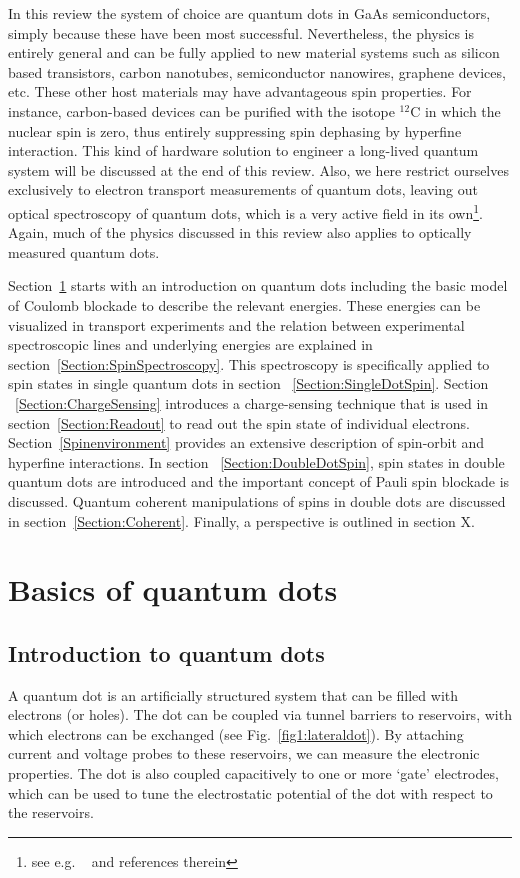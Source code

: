 \documentclass[12pt,aps,nofootinbib]{revtex4-1}
\begin{document}
In this review the system of choice are quantum dots in GaAs
semiconductors, simply because these have been most successful.
Nevertheless, the physics is entirely general and can be fully
applied to new material systems such as silicon based transistors,
carbon nanotubes, semiconductor nanowires, graphene devices, etc.
These other host materials may have advantageous spin properties.
For instance, carbon-based devices can be purified with the
isotope $^{12}$C in which the nuclear spin is zero, thus entirely
suppressing spin dephasing by hyperfine interaction. This kind of
hardware solution to engineer a long-lived quantum system will be
discussed at the end of this review.
Also, we here restrict ourselves exclusively to electron transport
measurements of quantum dots, leaving out optical spectroscopy of
quantum dots, which is a very active field in its own\footnote{see e.g. ~\textcite{greilich06a,AtatureScience2006,KrennerPRL2006,BerezovskyScience2006} and references therein}. Again, much of the physics discussed in this review also applies to optically 
measured quantum dots.

Section~\ref{Section:Basics} starts with an introduction on
quantum dots including the basic model of Coulomb blockade to
describe the relevant energies. These energies can be visualized
in transport experiments and the relation between experimental
spectroscopic lines and underlying energies are explained in
section~\ref{Section:SpinSpectroscopy}. This spectroscopy is
specifically applied to spin states in single quantum dots in
section ~\ref{Section:SingleDotSpin}. Section
~\ref{Section:ChargeSensing} introduces a charge-sensing technique
that is used in section~\ref{Section:Readout} to read out the spin
state of individual electrons. Section~\ref{Spinenvironment}
provides an extensive description of spin-orbit and hyperfine
interactions. In section ~\ref{Section:DoubleDotSpin}, spin states
in double quantum dots are introduced and the important concept of
Pauli spin blockade is discussed. Quantum coherent manipulations
of spins in double dots are discussed in
section~\ref{Section:Coherent}. Finally, a perspective is outlined
in section X.

\section{Basics of quantum dots}
\label{Section:Basics}
\subsection{Introduction to quantum dots}
A quantum dot is an artificially structured system that can be
filled with electrons (or holes). The dot can be coupled via
tunnel barriers to reservoirs, with which electrons can be
exchanged (see Fig.~\ref{fig1:lateraldot}). By attaching current
and voltage probes to these reservoirs, we can measure the
electronic properties. The dot is also coupled capacitively to one
or more `gate' electrodes, which can be used to tune the
electrostatic potential of the dot with respect to the reservoirs.
\end{document}
